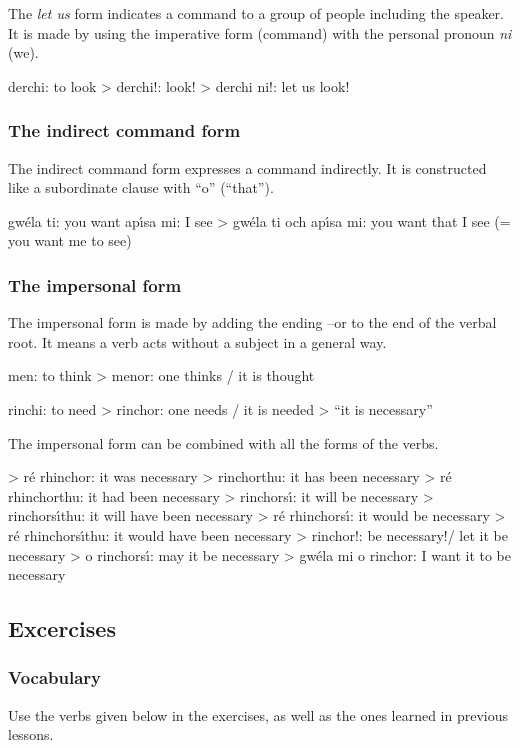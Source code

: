 The \textit{let us} form indicates a command to a group of people including the speaker. It is made by using the imperative form (command) with the personal pronoun \textit{ni} (we).

derchi: to look
> derchi!: look!
> derchi ni!: let us look!

\subsubsection{The indirect command form}

The indirect command form expresses a command indirectly. It is constructed like a subordinate clause with “o” (“that”).

gw\'{e}la ti: you want
ap\'{\i}sa mi: I see
> gw\'{e}la ti och ap\'{\i}sa mi: you want that I see (= you want me to see)

\subsubsection{The impersonal form}

The impersonal form is made by adding the ending –or to the end of the verbal root. It means a verb acts without a subject in a general way.

men: to think
> menor: one thinks / it is thought 

rinchi: to need
> rinchor: one needs / it is needed > “it is necessary”

The impersonal form can be combined with all the forms of the verbs.

> r\'{e} rhinchor: it was necessary
> rinchorthu: it has been necessary
> r\'{e} rhinchorthu: it had been necessary
> rinchors\'{\i}: it will be necessary
> rinchors\'{\i}thu: it will have been necessary
> r\'{e} rhinchors\'{\i}: it would be necessary
> r\'{e} rhinchors\'{\i}thu: it would have been necessary
> rinchor!: be necessary!/ let it be necessary
> o rinchors\'{\i}: may it be necessary
> gw\'{e}la mi o rinchor: I want it to be necessary


\subsection{Excercises}

\subsubsection{Vocabulary}
Use the verbs given below in the exercises, as well as the ones learned in previous lessons.


